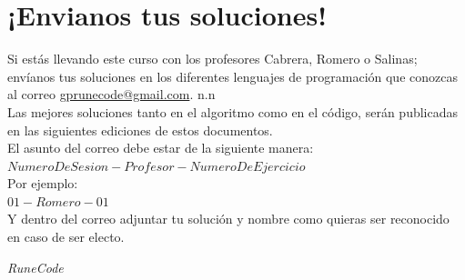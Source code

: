 \documentclass{article}
\begin{document}
\section*{¡Envianos tus soluciones!}
Si estás llevando este curso con los profesores Cabrera, Romero o Salinas;
envíanos tus soluciones en los diferentes lenguajes de programación que
conozcas al correo \href{mailto:gprunecode@gmail.com}{gprunecode@gmail.com}.
n.n \\ 

Las mejores soluciones tanto en el algoritmo como en el código, serán
publicadas en las siguientes ediciones de estos documentos.\\

El asunto del correo debe estar de la siguiente manera:\\
$NumeroDeSesion-Profesor-NumeroDeEjercicio$ \\
Por ejemplo:  \\
$01-Romero-01$ \\

Y dentro del correo adjuntar tu solución y nombre como quieras ser reconocido en caso de ser electo.

\vspace{2cm}
\LARGE\textit{RuneCode}
\end{document}
